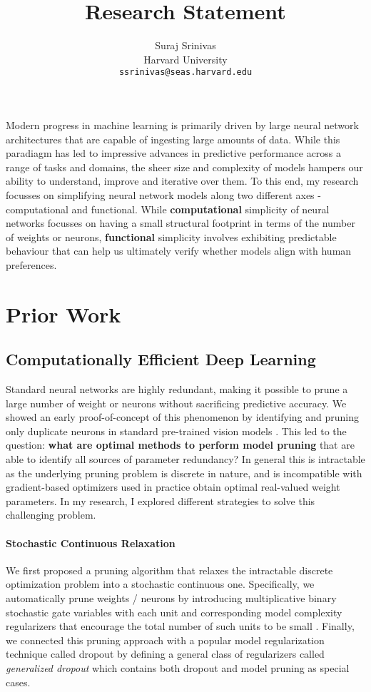 \documentclass{article}
\title{Research Statement}
\author{Suraj Srinivas \\
    {Harvard University}\\
    {\texttt{ssrinivas@seas.harvard.edu}}
	}
\date{}
\renewcommand{\cite}{\citep}
\begin{document}
\maketitle

\noindent Modern progress in machine learning is primarily driven by large neural network architectures that are capable of ingesting large amounts of data. While this paradiagm has led to impressive advances in predictive performance across a range of tasks and domains, the sheer size and complexity of models hampers our ability to understand, improve and iterative over them. To this end, my research focusses on simplifying neural network models along two different axes - computational and functional. While \textbf{computational} simplicity of neural networks focusses on having a small structural footprint in terms of the number of weights or neurons, \textbf{functional} simplicity involves exhibiting predictable behaviour that can help us ultimately verify whether models align with human preferences. 

\section*{Prior Work}
\subsection*{Computationally Efficient Deep Learning}
Standard neural networks are highly redundant, making it possible to prune a large number of weight or neurons without sacrificing predictive accuracy. We showed an early proof-of-concept of this phenomenon by identifying and pruning only duplicate neurons in standard pre-trained vision models \cite{srinivas2015data}. This led to the question: \textbf{what are optimal methods to perform model pruning} that are able to identify all sources of parameter redundancy? In general this is intractable as the underlying pruning problem is discrete in nature, and is incompatible with gradient-based optimizers used in practice obtain optimal real-valued weight parameters. In my research, I explored different strategies to solve this challenging problem. 

\paragraph*{Stochastic Continuous Relaxation} We first proposed a pruning algorithm that relaxes the intractable discrete optimization problem into a stochastic continuous one. Specifically, we automatically prune weights / neurons by introducing multiplicative binary stochastic gate variables with each unit and corresponding model complexity regularizers that encourage the total number of such units to be small \cite{srinivas2016learning,srinivas2017training}. Finally, we connected this pruning approach with a popular model regularization technique called dropout by defining a general class of regularizers called \textit{generalized dropout} \cite{srinivas2016generalized} which contains both dropout and model pruning as special cases.
\end{document}
